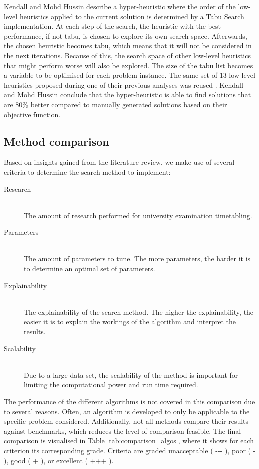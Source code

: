 Kendall and Mohd Hussin \cite{kendall2004} describe a hyper-heuristic where the order of the low-level heuristics applied to the current solution is determined by a Tabu Search implementation. At each step of the search, the heuristic with the best performance, if not tabu, is chosen to explore its own search space. Afterwards, the chosen heuristic becomes tabu, which means that it will not be considered in the next iterations. Because of this, the search space of other low-level heuristics that might perform worse will also be explored. The size of the tabu list becomes a variable to be optimised for each problem instance. The same set of 13 low-level heuristics proposed during one of their previous analyses was reused \cite{kendall2005}. Kendall and Mohd Hussin conclude that the hyper-heuristic is able to find solutions that are 80\% better compared to manually generated solutions based on their objective function.

\subsection{Method comparison} \label{sec_comp}

Based on insights gained from the literature review, we make use of several criteria to determine the search method to implement:
\begin{description} 
   \item [Research] \hfill \\ The amount of research performed for university examination timetabling. 
    \item [Parameters] \hfill \\ The amount of parameters to tune. The more parameters, the harder it is to determine an optimal set of parameters.
    \item [Explainability] \hfill \\ The explainability of the search method. The higher the explainability, the easier it is to explain the workings of the algorithm and interpret the results.
    \item [Scalability] \hfill \\ Due to a large data set, the scalability of the method is important for limiting the computational power and run time required.
\end{description}

The performance of the different algorithms is not covered in this comparison due to several reasons. Often, an algorithm is developed to only be applicable to the specific problem considered. Additionally, not all methods compare their results against benchmarks, which reduces the level of comparison feasible. The final comparison is visualised in Table \ref{tab:comparison_algos}, where it shows for each criterion its corresponding grade. Criteria are graded unacceptable ( -{}-{}-{} ), poor ( - ), good ( + ), or excellent ( +++ ).
 
